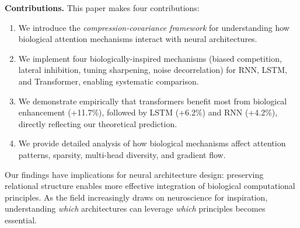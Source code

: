 \textbf{Contributions.} This paper makes four contributions:
\begin{enumerate}
\item We introduce the \textit{compression-covariance framework} for understanding how biological attention mechanisms interact with neural architectures.
\item We implement four biologically-inspired mechanisms (biased competition, lateral inhibition, tuning sharpening, noise decorrelation) for RNN, LSTM, and Transformer, enabling systematic comparison.
\item We demonstrate empirically that transformers benefit most from biological enhancement (+11.7\%), followed by LSTM (+6.2\%) and RNN (+4.2\%), directly reflecting our theoretical prediction.
\item We provide detailed analysis of how biological mechanisms affect attention patterns, sparsity, multi-head diversity, and gradient flow.
\end{enumerate}

Our findings have implications for neural architecture design: preserving relational structure enables more effective integration of biological computational principles. As the field increasingly draws on neuroscience for inspiration, understanding \textit{which} architectures can leverage \textit{which} principles becomes essential.
